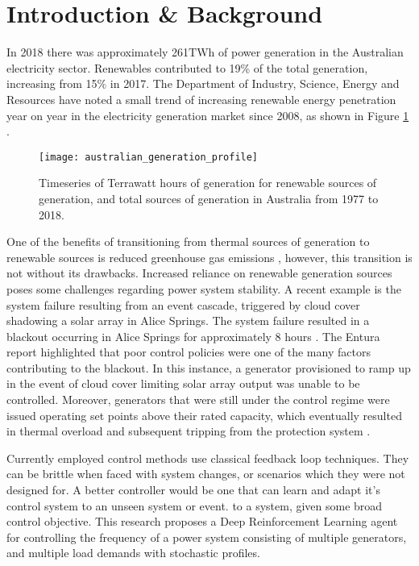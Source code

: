\section{Introduction \& Background}
In 2018 there was approximately 261$\si{\tera\watt\hour}$ of power generation in the Australian electricity sector. Renewables contributed to 19\% of the total generation, increasing from 15\% in 2017. The Department of Industry, Science, Energy and Resources have noted a small trend of increasing renewable energy penetration year on year in the electricity generation market since 2008, as shown in Figure \ref{fig:energyts} \cite{Diser2020}.
\begin{figure}[ht]
	\centering
	\texttt{[image: australian\_generation\_profile]}
	\caption{Timeseries of Terrawatt hours of generation for renewable sources of generation, and total sources of generation in Australia from 1977 to 2018.}
	\label{fig:energyts}
\end{figure}

One of the benefits of transitioning from thermal sources of generation to renewable sources is reduced greenhouse gas emissions \cite{IPCC2012}, however, this transition is not without its drawbacks. Increased reliance on renewable generation sources poses some challenges regarding power system stability. A recent example is the system failure resulting from an event cascade, triggered by cloud cover shadowing a solar array in Alice Springs. The system failure resulted in a blackout occurring in Alice Springs for approximately 8 hours \cite{UCNT2019}. The Entura report highlighted that poor control policies were one of the many factors contributing to the blackout. In this instance, a generator provisioned to ramp up in the event of cloud cover limiting solar array output was unable to be controlled. Moreover, generators that were still under the control regime were issued operating set points above their rated capacity, which eventually resulted in thermal overload and subsequent tripping from the protection system \cite{Wilkey2019}.

Currently employed control methods use classical feedback loop techniques. They can be brittle when faced with system changes, or scenarios which they were not designed for. A better controller would be one that can learn and adapt it's control system to an unseen system or event. to a system, given some broad control objective. This research proposes a Deep Reinforcement Learning agent for controlling the frequency of a power system consisting of multiple generators, and multiple load demands with stochastic profiles.

